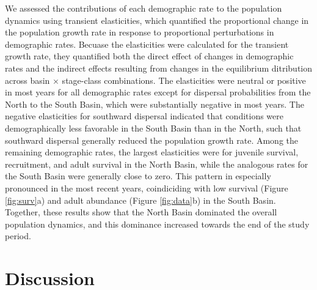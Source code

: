 \documentclass[11pt]{article}
\begin{document}
We assessed the contributions of each demographic rate to the population dynamics
using transient elasticities,
which quantified the proportional change in the population growth rate in 
response to proportional perturbations in demographic rates.
Becuase the elasticities were calculated for the transient growth rate,
they quantified both the direct effect of changes in demographic rates 
and the indirect effects resulting from changes in the equilibrium ditribution
across basin $\times$ stage-class combinations.
The elasticities were neutral or positive in most years for all demographic rates 
except for dispersal probabilities from the North to the South Basin,
which were substantially negative in most years.
The negative elasticities for southward dispersal indicated that conditions were 
demographically less favorable in the South Basin than in the North,
such that southward dispersal generally reduced the population growth rate.
Among the remaining demographic rates,
the largest elasticities were for juvenile survival, recruitment, and adult survival
in the North Basin, while the analogous rates for the South Basin were generally close to zero.
This pattern in especially pronounced in the most recent years,
coindiciding with low survival (Figure \ref{fig:surv}a) 
and adult abundance (Figure \ref{fig:data}b) in the South Basin.
Together, these results show that the North Basin dominated 
the overall population dynamics, 
and this dominance increased towards the end of the study period.








\section*{Discussion}
\end{document}
